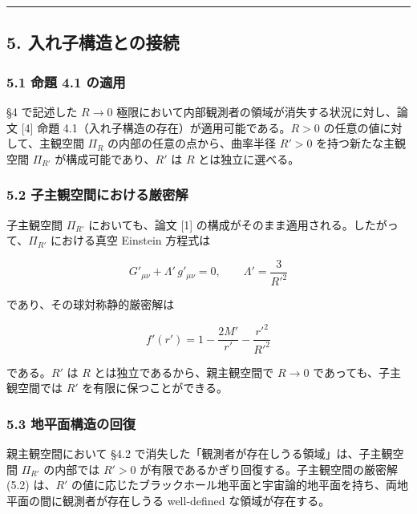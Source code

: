 \documentclass[a4paper,11pt]{ltjsarticle}
\theoremstyle{definition}
\begin{document}
\begin{center}\rule{0.5\linewidth}{0.5pt}\end{center}

\subsection{5.
入れ子構造との接続}\label{ux5165ux308cux5b50ux69cbux9020ux3068ux306eux63a5ux7d9a}

\subsubsection{5.1 命題 4.1
の適用}\label{ux547dux984c-4.1-ux306eux9069ux7528}

§4 で記述した \(R \to 0\)
極限において内部観測者の領域が消失する状況に対し、論文 {[}4{]} 命題
4.1（入れ子構造の存在）が適用可能である。\(R > 0\)
の任意の値に対して、主観空間 \(\Pi_R\) の内部の任意の点から、曲率半径
\(R' > 0\) を持つ新たな主観空間 \(\Pi_{R'}\) が構成可能であり、\(R'\) は
\(R\) とは独立に選べる。

\subsubsection{5.2
子主観空間における厳密解}\label{ux5b50ux4e3bux89b3ux7a7aux9593ux306bux304aux3051ux308bux53b3ux5bc6ux89e3}

子主観空間 \(\Pi_{R'}\) においても、論文 {[}1{]}
の構成がそのまま適用される。したがって、\(\Pi_{R'}\) における真空
Einstein 方程式は

\[G'_{\mu\nu} + \Lambda'\, g'_{\mu\nu} = 0, \qquad \Lambda' = \frac{3}{R'^2} \tag{5.1}\]

であり、その球対称静的厳密解は

\[f'(r') = 1 - \frac{2M'}{r'} - \frac{r'^2}{R'^2} \tag{5.2}\]

である。\(R'\) は \(R\) とは独立であるから、親主観空間で \(R \to 0\)
であっても、子主観空間では \(R'\) を有限に保つことができる。

\subsubsection{5.3
地平面構造の回復}\label{ux5730ux5e73ux9762ux69cbux9020ux306eux56deux5fa9}

親主観空間において §4.2
で消失した「観測者が存在しうる領域」は、子主観空間 \(\Pi_{R'}\)
の内部では \(R' > 0\) が有限であるかぎり回復する。子主観空間の厳密解
(5.2) は、\(R'\)
の値に応じたブラックホール地平面と宇宙論的地平面を持ち、両地平面の間に観測者が存在しうる
well-defined な領域が存在する。
\end{document}
